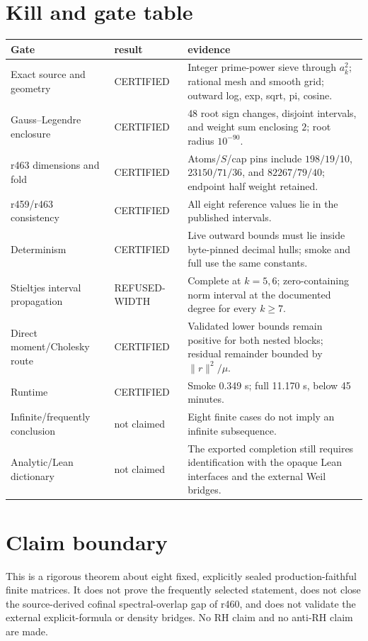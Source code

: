 \documentclass[11pt]{article}
\theoremstyle{remark}
\newcommand{\cert}{\textcolor{green!40!black}{CERTIFIED}}
\newcommand{\refuse}{\textcolor{orange!85!black}{REFUSED-WIDTH}}
\begin{document}
\section{Kill and gate table}

\begin{center}
\small
\begin{tabular}{@{}p{4.1cm}p{2.1cm}p{7.3cm}@{}}
\toprule
Gate & result & evidence\\
\midrule
Exact source and geometry & \cert &
Integer prime-power sieve through $a_k^2$; rational mesh and smooth
grid; outward log, exp, sqrt, pi, cosine.\\
Gauss--Legendre enclosure & \cert &
48 root sign changes, disjoint intervals, and weight sum enclosing
$2$; root radius $10^{-90}$.\\
r463 dimensions and fold & \cert &
Atoms/$S$/cap pins include $198/19/10$, $23150/71/36$, and
$82267/79/40$; endpoint half weight retained.\\
r459/r463 consistency & \cert &
All eight reference values lie in the published intervals.\\
Determinism & \cert &
Live outward bounds must lie inside byte-pinned decimal hulls;
smoke and full use the same constants.\\
Stieltjes interval propagation & \refuse &
Complete at $k=5,6$; zero-containing norm interval at the documented
degree for every $k\ge7$.\\
Direct moment/Cholesky route & \cert &
Validated lower bounds remain positive for both nested blocks;
residual remainder bounded by $\|r\|^2/\mu$.\\
Runtime & \cert &
Smoke 0.349 s; full 11.170 s, below 45 minutes.\\
Infinite/frequently conclusion & not claimed &
Eight finite cases do not imply an infinite subsequence.\\
Analytic/Lean dictionary & not claimed &
The exported completion still requires identification with the
opaque Lean interfaces and the external Weil bridges.\\
\bottomrule
\end{tabular}
\end{center}

\section*{Claim boundary}

This is a rigorous theorem about eight fixed, explicitly sealed
production-faithful finite matrices.  It does not prove the frequently
selected statement, does not close the source-derived cofinal
spectral-overlap gap of r460, and does not validate the external
explicit-formula or density bridges.  No RH claim and no anti-RH
claim are made.
\end{document}
